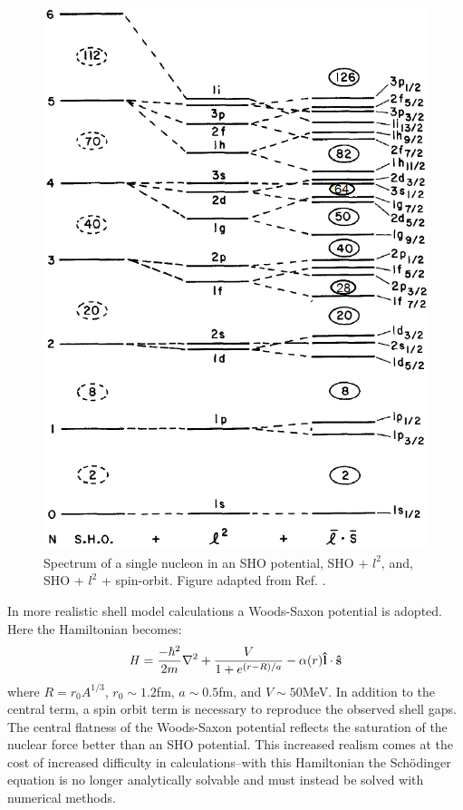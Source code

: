 \begin{figure}
\centerline{\includegraphics[height=0.45\textheight]{./img/c2/shell_model.png}}
	\caption{Spectrum of a single nucleon in an SHO potential, SHO + $l^2$, and, SHO + $l^2$ + spin-orbit. Figure adapted from Ref. \cite{casten}.\label{fig:chp2-shell-model}}
\end{figure}

In more realistic shell model calculations a Woods-Saxon potential is adopted. Here the Hamiltonian becomes:
\begin{equation}
\label{eqn:chp2-sm-ws-hamil}
\mathbf{\mathit{H}} = \frac{-\hbar^2}{2m}\nabla^2 + \frac{V}{1+e^{(r-R)/a}} - \alpha(r)\boldsymbol{\hat{\textbf{l}}}\cdot\boldsymbol{\hat{\textbf{s}}}
\end{equation}
where $R=r_0A^{1/3}$, $r_0\sim1.2$fm, $a\sim0.5$fm, and $V\sim50$MeV. In addition to the central term, a spin orbit term is necessary to reproduce the observed shell gaps. The central flatness of the Woods-Saxon potential reflects the saturation of the nuclear force better than an SHO potential. This increased realism comes at the cost of increased difficulty in calculations--with this Hamiltonian the Sch\"odinger equation is no longer analytically solvable and must instead be solved with numerical methods.

